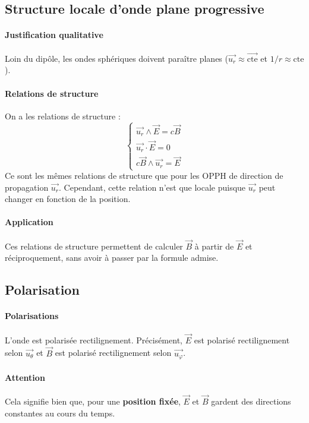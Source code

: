 \documentclass[french]{book}
\theoremstyle{plain}
\theoremstyle{definition}
\theoremstyle{remark}
\begin{document}
\subsection{Structure locale d'onde plane progressive}
\paragraph{Justification qualitative} Loin du dipôle, les ondes sphériques doivent paraître planes ($\overrightarrow{u_r}\approx\overrightarrow{\text{cte}}$ et $1/r\approx\text{cte}$).
\paragraph{Relations de structure} On a les relations de structure : $$\begin{cases}
	\overrightarrow{u_r}\wedge\overrightarrow{E}=c\overrightarrow{B} \\
	\overrightarrow{u_r}\cdot\overrightarrow{E}=0 \\
	c\overrightarrow{B}\wedge\overrightarrow{u_r}=\overrightarrow{E}
\end{cases}$$ Ce sont les mêmes relations de structure que pour les OPPH de direction de propagation $\overrightarrow{u_r}$. Cependant, cette relation n'est que locale puisque $\overrightarrow{u_r}$ peut changer en fonction de la position.
\paragraph{Application} Ces relations de structure permettent de calculer $\overrightarrow{B}$ à partir de $\overrightarrow{E}$ et réciproquement, sans avoir à passer par la formule admise.
\subsection{Polarisation}
\paragraph{Polarisations} L'onde est polarisée rectilignement. Précisément, $\overrightarrow{E}$ est polarisé rectilignement selon $\overrightarrow{u_\theta}$
et $\overrightarrow{B}$ est polarisé rectilignement selon $\overrightarrow{u_\varphi}$.
\paragraph{Attention} Cela signifie bien que, pour une \textbf{position fixée}, $\overrightarrow{E}$ et $\overrightarrow{B}$ gardent des directions constantes au cours du temps.
\end{document}
